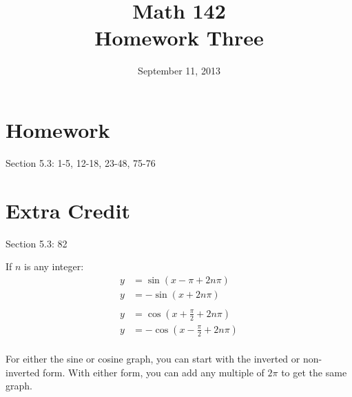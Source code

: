 \documentclass{exam}
\author{}
\date{September 11, 2013}
\title{Math 142 \\ Homework Three}
\begin{document}
  \maketitle

  \section{Homework}
  Section 5.3: 1-5, 12-18, 23-48, 75-76

  \section{Extra Credit}
  Section 5.3: 82

  \ifprintanswers

    If $n$ is any integer:
    \begin{align*}
      y  & = \sin (x - \pi + 2n\pi) \\
      y  & = - \sin (x + 2n \pi) \\
      \\
      y  & = \cos \left( x + \frac{\pi}{2} + 2n\pi\right ) \\
      y  & = - \cos \left( x - \frac{\pi}{2} + 2n\pi\right ) \\
    \end{align*}

    For either the sine or cosine graph, you can start with the inverted or non-inverted form.  With either form, you can
    add any multiple of $2 \pi$ to get the same graph.
\end{document}

